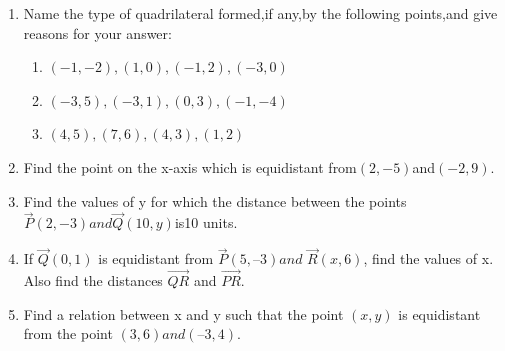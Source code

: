 \documentclass[12pt]{article}
\begin{document}
\begin{enumerate}
\item Name the type of quadrilateral formed,if any,by the following points,and give reasons for your answer:
\begin{enumerate}
\item $(-1,-2),(1,0),(-1,2),(-3,0)$
\item $(-3,5),(-3,1),(0,3),(-1,-4)$
\item $(4,5),(7,6),(4,3),(1,2)$
\end{enumerate}
\item Find the point on the x-axis which is equidistant from$(2,-5)$and$(-2,9)$.
\item Find the values of y for which the distance between the points                  $\vec{P}(2,-3) and \vec{Q}(10,y)$is10 units.
\item  If $\vec{Q}(0, 1)$ is equidistant from $\vec{P}(5, –3) and$ $\vec{R}(x, 6)$, find the values of x. Also find the
distances $\vec{QR}$ and $\vec{PR}$.
\item  Find a relation between x and y such that the point $(x,y)$ is equidistant from the point
$(3, 6) and (– 3, 4)$.

\end{enumerate}
\end{document}

